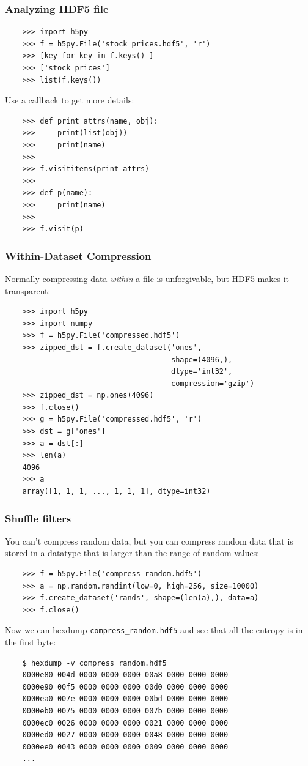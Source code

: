 \documentclass[9pt]{beamer}
\begin{document}
\begin{frame}[fragile]
  \frametitle{Analyzing HDF5 file}
  \begin{verbatim}
    >>> import h5py
    >>> f = h5py.File('stock_prices.hdf5', 'r')
    >>> [key for key in f.keys() ]
    >>> ['stock_prices']
    >>> list(f.keys())
  \end{verbatim}
  \pause
  Use a callback to get more details:
  \begin{verbatim}
    >>> def print_attrs(name, obj):
    >>>     print(list(obj))
    >>>     print(name)
    >>>
    >>> f.visititems(print_attrs)
    >>>
    >>> def p(name):
    >>>     print(name)
    >>>
    >>> f.visit(p)
  \end{verbatim}
\end{frame}

\begin{frame}[fragile]
  \frametitle{Within-Dataset Compression}
  Normally compressing data \emph{within} a file is unforgivable, but HDF5 makes it transparent:
  \begin{verbatim}
    >>> import h5py
    >>> import numpy
    >>> f = h5py.File('compressed.hdf5')
    >>> zipped_dst = f.create_dataset('ones',
                                      shape=(4096,), 
                                      dtype='int32',
                                      compression='gzip')
    >>> zipped_dst = np.ones(4096)
    >>> f.close()
    >>> g = h5py.File('compressed.hdf5', 'r')
    >>> dst = g['ones']
    >>> a = dst[:]
    >>> len(a)
    4096
    >>> a
    array([1, 1, 1, ..., 1, 1, 1], dtype=int32)
  \end{verbatim}
\end{frame}

\begin{frame}[fragile]
  \frametitle{Shuffle filters}
  You can't compress random data, but you can compress random data that is stored in a datatype that is larger than the range of random values:
  \begin{verbatim}
    >>> f = h5py.File('compress_random.hdf5')
    >>> a = np.random.randint(low=0, high=256, size=10000)
    >>> f.create_dataset('rands', shape=(len(a),), data=a)
    >>> f.close()
  \end{verbatim}
  Now we can hexdump \texttt{compress\_random.hdf5} and see that all the entropy is in the first byte:
  \begin{verbatim}
    $ hexdump -v compress_random.hdf5
    0000e80 004d 0000 0000 0000 00a8 0000 0000 0000
    0000e90 00f5 0000 0000 0000 00d0 0000 0000 0000
    0000ea0 007e 0000 0000 0000 00bd 0000 0000 0000
    0000eb0 0075 0000 0000 0000 007b 0000 0000 0000
    0000ec0 0026 0000 0000 0000 0021 0000 0000 0000
    0000ed0 0027 0000 0000 0000 0048 0000 0000 0000
    0000ee0 0043 0000 0000 0000 0009 0000 0000 0000
    ...
  \end{verbatim}
\end{frame}
\end{document}
